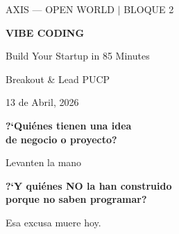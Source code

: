 \documentclass[aspectratio=169]{beamer}
\begin{document}
\begin{frame}[plain]
\begin{center}
\vspace{1.2cm}
{\fontsize{14}{16}\selectfont\color{accentlight} AXIS --- OPEN WORLD $\vert$ BLOQUE 2}

\vspace{0.6cm}
{\fontsize{40}{44}\selectfont\bfseries\color{textwhite} VIBE CODING}

\vspace{0.3cm}
{\fontsize{18}{22}\selectfont\color{accent} Build Your Startup in 85 Minutes}

\vspace{1.2cm}
{\color{textgray}\large Breakout \& Lead PUCP}

\vspace{0.3cm}
{\color{textgray} 13 de Abril, 2026}
\end{center}
\end{frame}

\begin{frame}[plain]
\begin{center}
\vspace{2cm}
{\fontsize{28}{32}\selectfont\color{textwhite}\bfseries ?`Qui\'enes tienen una idea\\[8pt] de negocio o proyecto?}

\vspace{2cm}
{\fontsize{18}{22}\selectfont\color{accent} Levanten la mano}
\end{center}
\end{frame}

\begin{frame}[plain]
\begin{center}
\vspace{2cm}
{\fontsize{28}{32}\selectfont\color{textwhite}\bfseries ?`Y qui\'enes NO la han construido\\[8pt] porque no saben programar?}

\vspace{2cm}
{\fontsize{18}{22}\selectfont\color{warning} Esa excusa muere hoy.}
\end{center}
\end{frame}
\end{document}
